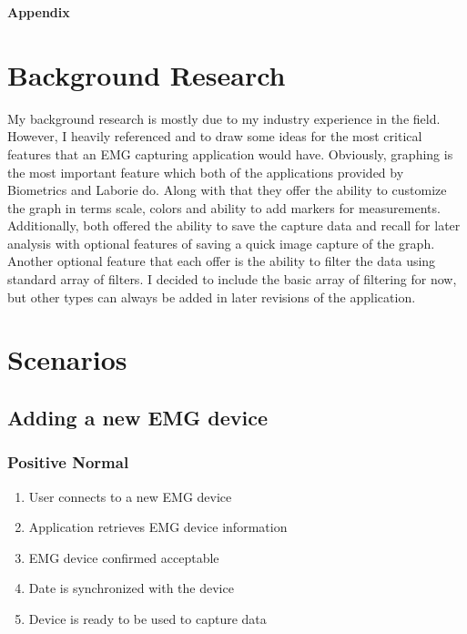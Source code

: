 \documentclass[12pt,a4paper]{article}
\begin{document}
\newpage

\begin{flushleft}
\textbf{{\Large Appendix}}
\end{flushleft}
\appendix
\section{Background Research}

My background research is mostly due to my industry experience in the field. However, I heavily referenced \cite{Biometrics} and \cite{Laborie}
to draw some ideas for the most critical features that an EMG capturing application would have. Obviously, graphing is the most important feature
which both of the applications provided by Biometrics and Laborie do. Along with that they offer the ability to customize the graph in terms scale,
colors and ability to add markers for measurements. Additionally, both offered the ability to save the capture data and recall for later analysis 
with optional features of saving a quick image capture of the graph. Another optional feature that each offer is the ability to filter the data using
standard array of filters. I decided to include the basic array of filtering for now, but other types can always be added in later revisions of the application. 

\newpage

\section{Scenarios}

\subsection{Adding a new EMG device}

\subsubsection{Positive Normal}

\begin{enumerate}
	\item User connects to a new EMG device
	\item Application retrieves EMG device information
	\item EMG device confirmed acceptable
	\item Date is synchronized with the device
	\item Device is ready to be used to capture data
\end{enumerate}
\end{document}
